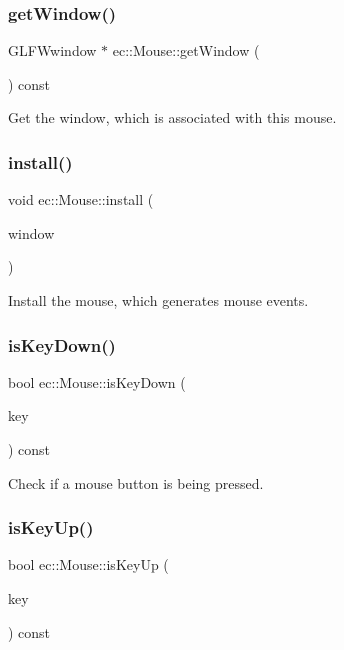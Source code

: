 \subsubsection{\texorpdfstring{get\+Window()}{getWindow()}}
{\footnotesize\ttfamily G\+L\+F\+Wwindow $\ast$ ec\+::\+Mouse\+::get\+Window (\begin{DoxyParamCaption}{ }\end{DoxyParamCaption}) const}

Get the window, which is associated with this mouse. \mbox{\label{classec_1_1_mouse_a7e679de43ed15a8366d15ebf641c7b97}} 
\subsubsection{\texorpdfstring{install()}{install()}}
{\footnotesize\ttfamily void ec\+::\+Mouse\+::install (\begin{DoxyParamCaption}\item[{\mbox{\hyperlink{classec_1_1_window}{Window}} $\ast$}]{window }\end{DoxyParamCaption})}

Install the mouse, which generates mouse events. \mbox{\label{classec_1_1_mouse_a3d5fd51a99aae2800604ecc5cb01ae21}} 
\subsubsection{\texorpdfstring{is\+Key\+Down()}{isKeyDown()}}
{\footnotesize\ttfamily bool ec\+::\+Mouse\+::is\+Key\+Down (\begin{DoxyParamCaption}\item[{\mbox{\hyperlink{classec_1_1_mouse_acabdd3509adc381e415c60b29554e2fb}{Mouse\+::\+E\+C\+\_\+\+K\+E\+Y\+\_\+\+M\+O\+U\+SE}}}]{key }\end{DoxyParamCaption}) const}

Check if a mouse button is being pressed. \mbox{\label{classec_1_1_mouse_a0e7b2dc5f3b7b9ea2a348fa7a44fb629}} 
\subsubsection{\texorpdfstring{is\+Key\+Up()}{isKeyUp()}}
{\footnotesize\ttfamily bool ec\+::\+Mouse\+::is\+Key\+Up (\begin{DoxyParamCaption}\item[{\mbox{\hyperlink{classec_1_1_mouse_acabdd3509adc381e415c60b29554e2fb}{Mouse\+::\+E\+C\+\_\+\+K\+E\+Y\+\_\+\+M\+O\+U\+SE}}}]{key }\end{DoxyParamCaption}) const}

